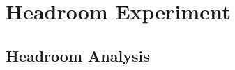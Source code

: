 \section{Headroom Experiment}
\label{sec:headroom}

  \subsection{Headroom Analysis}
  \label{sec:headroomanalysis}
